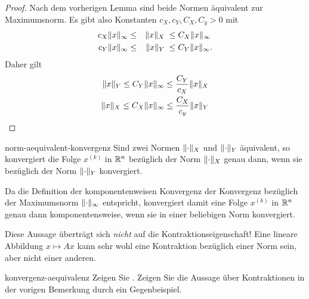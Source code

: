 \begin{proof}
  Nach dem vorherigen Lemma sind beide Normen äquivalent zur Maximumsnorm. Es gibt also Konstanten $c_X, c_Y, C_X, C_y>0$ mit
  \begin{gather}
    \begin{aligned}
     c_X \lVert x\rVert_\infty &\le &\lVert x\rVert_X \;&\le C_X \lVert x\rVert_\infty\\
     c_Y \lVert x\rVert_\infty &\le &\lVert x\rVert_Y \;&\le C_Y \lVert x\rVert_\infty.
    \end{aligned}
  \end{gather}
  Daher gilt
  \begin{gather}
    \begin{split}
      \lVert x\rVert_Y \le C_Y\lVert x\rVert_\infty &\le \frac{C_Y}{c_X} \lVert x\rVert_X\\
      \lVert x\rVert_X \le C_X\lVert x\rVert_\infty &\le \frac{C_X}{c_y} \lVert x\rVert_Y
    \end{split}
  \end{gather}
\end{proof}

\begin{Lemma}{norm-aequivalent-konvergenz}
  Sind zwei Normen $\lVert\cdot\rVert_X$ und $\lVert\cdot\rVert_Y$ äquivalent,
  so konvergiert die Folge $x^{(k)}$ in $\mathbb R^n$ bezüglich der Norm
  $\lVert\cdot\rVert_X$ genau dann, wenn sie bezüglich der Norm
  $\lVert\cdot\rVert_Y$ konvergiert.
\end{Lemma}

\begin{remark}
  Da die Definition der komponentenweisen Konvergenz der Konvergenz
  bezüglich der Maximumsnorm $\lVert\cdot\rVert_\infty$ entspricht,
  konvergiert damit eine Folge $x^{(k)}$ in $\mathbb R^n$ genau dann
  komponentensweise, wenn sie in einer beliebigen Norm konvergiert.

  Diese Aussage überträgt sich \emph{nicht} auf die
  Kontraktionseigenschaft! Eine lineare Abbildung $x\mapsto Ax$ kann
  sehr wohl eine Kontraktion bezüglich einer Norm sein, aber nicht
  einer anderen.
\end{remark}

\begin{Aufgabe}{konvergenz-aequivalenz}
  Zeigen Sie . Zeigen Sie
  die Aussage über Kontraktionen in der vorigen Bemerkung durch ein
  Gegenbeispiel.
\end{Aufgabe}


